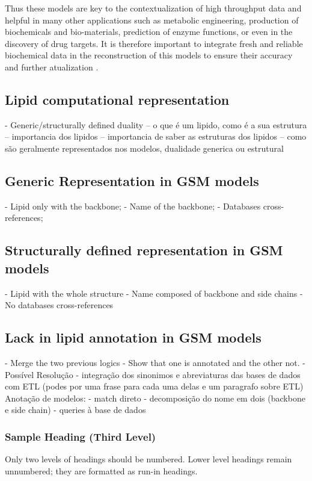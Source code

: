 \documentclass{llncs}
\begin{document}
Thus these models are key to the contextualization of high throughput data and helpful in many other applications such as metabolic engineering, production of biochemicals and bio-materials, prediction of enzyme functions, or even in the discovery of drug targets\cite{Gu2019,Kim2017}.
It is therefore important to integrate fresh and reliable biochemical data in the reconstruction of this models to ensure their accuracy and further atualization \cite{Moseley2021,Passi2021}. 


\subsection{Lipid computational representation}

- Generic/structurally defined duality
-- o que é um lipido, como é a sua estrutura
-- importancia dos lipidos
-- importancia de saber as estruturas dos lipidos
-- como são geralmente representados nos modelos, dualidade generica ou estrutural


\subsection{Generic Representation in GSM models}

- Lipid only with the backbone; 
- Name of the backbone;
- Databases cross-references;

\subsection{Structurally defined representation in GSM models}

- Lipid with the whole structure
- Name composed of backbone and side chains
- No databases cross-references

\subsection{Lack in lipid annotation in GSM models}

- Merge the two previous logics
- Show that one is annotated and the other not.
- Possível Resolução
    - integração dos sinonimos e abreviaturas das bases de dados com ETL (podes por uma frase para cada uma delas e um paragrafo sobre ETL)
    Anotação de modelos:
        - match direto
        - decomposição do nome em dois (backbone e side chain) - queries à base de dados

\subsubsection{Sample Heading (Third Level)} Only two levels of
headings should be numbered. Lower level headings remain unnumbered;
they are formatted as run-in headings.
\end{document}
